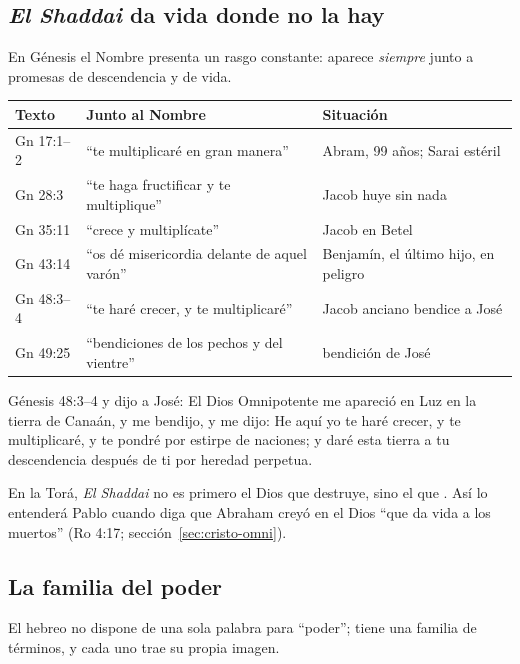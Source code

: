 \subsection{\emph{El Shaddai} da vida donde no la hay}

En Génesis el Nombre presenta un rasgo constante: aparece \emph{siempre} junto a promesas de descendencia y de vida.

\begin{center}\small\renewcommand{\arraystretch}{1.2}
\begin{tabular}{@{}L{2.4cm}L{7.4cm}L{4.6cm}@{}}
\toprule
\textbf{Texto} & \textbf{Junto al Nombre} & \textbf{Situación} \\ \midrule
Gn 17:1--2 & ``te multiplicaré en gran manera'' & Abram, 99 años; Sarai estéril \\
Gn 28:3 & ``te haga fructificar y te multiplique'' & Jacob huye sin nada \\
Gn 35:11 & ``crece y multiplícate'' & Jacob en Betel \\
Gn 43:14 & ``os dé misericordia delante de aquel varón'' & Benjamín, el último hijo, en peligro \\
Gn 48:3--4 & ``te haré crecer, y te multiplicaré'' & Jacob anciano bendice a José \\
Gn 49:25 & ``bendiciones de los pechos y del vientre'' & bendición de José \\
\bottomrule
\end{tabular}\end{center}

\begin{verso}{Génesis 48:3–4}
y dijo a José: El Dios Omnipotente me apareció en Luz en la tierra de Canaán, y me bendijo, y me dijo: He aquí yo te haré crecer, y te multiplicaré, y te pondré por estirpe de naciones; y daré esta tierra a tu descendencia después de ti por heredad perpetua.
\end{verso}

En la Torá, \emph{El Shaddai} no es primero el Dios que destruye, sino el que . Así lo entenderá Pablo cuando diga que Abraham creyó en el Dios ``que da vida a los muertos'' (Ro 4:17; sección~\ref{sec:cristo-omni}).

\subsection{La familia del poder}

El hebreo no dispone de una sola palabra para ``poder''; tiene una familia de términos, y cada uno trae su propia imagen.

